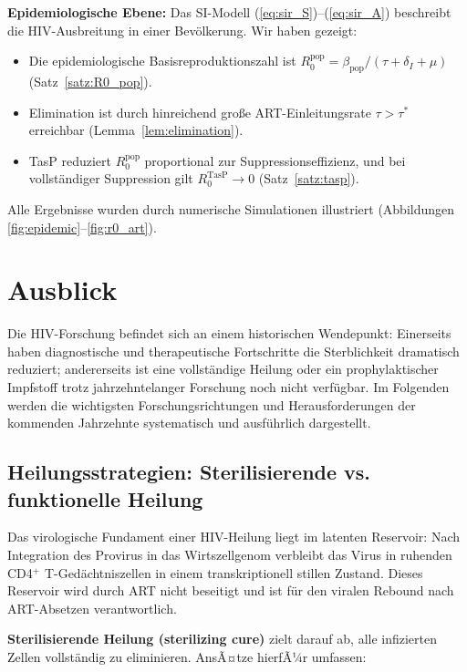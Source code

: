 ﻿\documentclass[a4paper,12pt]{article}
\theoremstyle{definition}
\begin{document}
\textbf{Epidemiologische Ebene:} Das SI-Modell (\ref{eq:sir_S})--(\ref{eq:sir_A}) beschreibt
die HIV-Ausbreitung in einer Bev\"olkerung. Wir haben gezeigt:
\begin{itemize}
\item Die epidemiologische Basisreproduktionszahl ist $R_0^{\text{pop}} = \beta_{\text{pop}} / (\tau + \delta_I + \mu)$
      (Satz~\ref{satz:R0_pop}).
\item Elimination ist durch hinreichend gro\ss e ART-Einleitungsrate $\tau > \tau^*$ erreichbar
      (Lemma~\ref{lem:elimination}).
\item TasP reduziert $R_0^{\text{pop}}$ proportional zur Suppressionseffizienz, und bei
      vollst\"andiger Suppression gilt $R_0^{\text{TasP}} \to 0$ (Satz~\ref{satz:tasp}).
\end{itemize}

Alle Ergebnisse wurden durch numerische Simulationen illustriert (Abbildungen
\ref{fig:epidemic}--\ref{fig:r0_art}).

\section{Ausblick}

Die HIV-Forschung befindet sich an einem historischen Wendepunkt: Einerseits haben
diagnostische und therapeutische Fortschritte die Sterblichkeit dramatisch reduziert;
andererseits ist eine vollst\"andige Heilung oder ein prophylaktischer Impfstoff
trotz jahrzehntelanger Forschung noch nicht verf\"ugbar. Im Folgenden werden die
wichtigsten Forschungsrichtungen und Herausforderungen der kommenden Jahrzehnte
systematisch und ausf\"uhrlich dargestellt.

\subsection{Heilungsstrategien: Sterilisierende vs. funktionelle Heilung}

Das virologische Fundament einer HIV-Heilung liegt im latenten Reservoir: Nach
Integration des Provirus in das Wirtszellgenom verbleibt das Virus in ruhenden
CD4$^+$ T-Ged\"achtniszellen in einem transkriptionell stillen Zustand.
Dieses Reservoir wird durch ART nicht beseitigt und ist f\"ur den viralen Rebound
nach ART-Absetzen verantwortlich.

\textbf{Sterilisierende Heilung (sterilizing cure)} zielt darauf ab, alle infizierten
Zellen vollst\"andig zu eliminieren. AnsÃ¤tze hierfÃ¼r umfassen:
\end{document}
